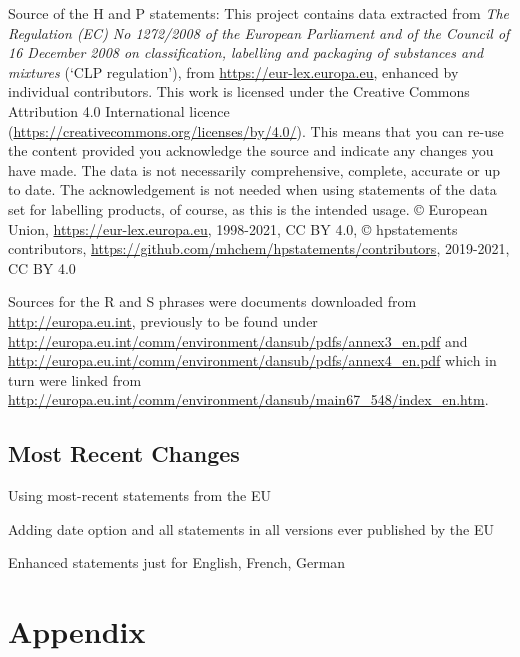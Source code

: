 \documentclass[a4paper,notitlepage,parskip=half]{scrreprt}
\newenvironment{annotation}{\bgroup\footnotesize}{\par\egroup}
\begin{document}
\begin{annotation}\RaggedRight\sloppypar Source of the H and P statements:
This project contains data extracted from
\emph{The Regulation (EC) No 1272/2008 of the European Parliament and of the Council of 16 December 2008 on classification, labelling and packaging of substances and mixtures}
(`CLP regulation'),
from \url{https://eur-lex.europa.eu},
enhanced by individual contributors.
This work is licensed under the
Creative Commons Attribution 4.0 International licence
(\url{https://creativecommons.org/licenses/by/4.0/}).
This means that you can re-use the content provided you acknowledge the source and indicate any changes you have made.
The data is not necessarily comprehensive, complete, accurate or up to date.
The acknowledgement is not needed when using statements of the data set for labelling products, of course, as this is the intended usage.
© European Union, \url{https://eur-lex.europa.eu}, 1998-2021, CC BY 4.0,
© hpstatements contributors, \url{https://github.com/mhchem/hpstatements/contributors}, 2019-2021, CC BY 4.0

Sources for the R and S phrases were documents downloaded from
\url{http://europa.eu.int}, previously to be found under
\url{http://europa.eu.int/comm/environment/dansub/pdfs/annex3_en.pdf} and
\url{http://europa.eu.int/comm/environment/dansub/pdfs/annex4_en.pdf}
which in turn were linked from
\url{http://europa.eu.int/comm/environment/dansub/main67_548/index_en.htm}.
\end{annotation}


\section{Most Recent Changes}%

\begin{compactitem}
  \item Using most-recent statements from the EU
  \item Adding date option and all statements in all versions ever published by the EU
  \item Enhanced statements just for English, French, German
\end{compactitem}



\appendix
\chapter{Appendix}
\end{document}
